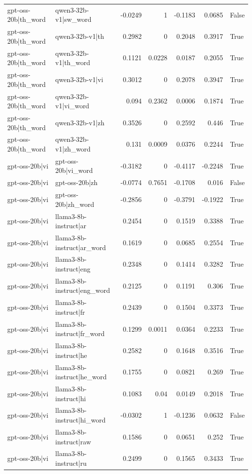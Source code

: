 \begin{table}
\begin{tabular}{l l r r r r l}
gpt-oss-20b|th_word & qwen3-32b-v1|sw_word & -0.0249 & 1 & -0.1183 & 0.0685 & False \\
gpt-oss-20b|th_word & qwen3-32b-v1|th & 0.2982 & 0 & 0.2048 & 0.3917 & True \\
gpt-oss-20b|th_word & qwen3-32b-v1|th_word & 0.1121 & 0.0228 & 0.0187 & 0.2055 & True \\
gpt-oss-20b|th_word & qwen3-32b-v1|vi & 0.3012 & 0 & 0.2078 & 0.3947 & True \\
gpt-oss-20b|th_word & qwen3-32b-v1|vi_word & 0.094 & 0.2362 & 0.0006 & 0.1874 & True \\
gpt-oss-20b|th_word & qwen3-32b-v1|zh & 0.3526 & 0 & 0.2592 & 0.446 & True \\
gpt-oss-20b|th_word & qwen3-32b-v1|zh_word & 0.131 & 0.0009 & 0.0376 & 0.2244 & True \\
gpt-oss-20b|vi & gpt-oss-20b|vi_word & -0.3182 & 0 & -0.4117 & -0.2248 & True \\
gpt-oss-20b|vi & gpt-oss-20b|zh & -0.0774 & 0.7651 & -0.1708 & 0.016 & False \\
gpt-oss-20b|vi & gpt-oss-20b|zh_word & -0.2856 & 0 & -0.3791 & -0.1922 & True \\
gpt-oss-20b|vi & llama3-8b-instruct|ar & 0.2454 & 0 & 0.1519 & 0.3388 & True \\
gpt-oss-20b|vi & llama3-8b-instruct|ar_word & 0.1619 & 0 & 0.0685 & 0.2554 & True \\
gpt-oss-20b|vi & llama3-8b-instruct|eng & 0.2348 & 0 & 0.1414 & 0.3282 & True \\
gpt-oss-20b|vi & llama3-8b-instruct|eng_word & 0.2125 & 0 & 0.1191 & 0.306 & True \\
gpt-oss-20b|vi & llama3-8b-instruct|fr & 0.2439 & 0 & 0.1504 & 0.3373 & True \\
gpt-oss-20b|vi & llama3-8b-instruct|fr_word & 0.1299 & 0.0011 & 0.0364 & 0.2233 & True \\
gpt-oss-20b|vi & llama3-8b-instruct|he & 0.2582 & 0 & 0.1648 & 0.3516 & True \\
gpt-oss-20b|vi & llama3-8b-instruct|he_word & 0.1755 & 0 & 0.0821 & 0.269 & True \\
gpt-oss-20b|vi & llama3-8b-instruct|hi & 0.1083 & 0.04 & 0.0149 & 0.2018 & True \\
gpt-oss-20b|vi & llama3-8b-instruct|hi_word & -0.0302 & 1 & -0.1236 & 0.0632 & False \\
gpt-oss-20b|vi & llama3-8b-instruct|raw & 0.1586 & 0 & 0.0651 & 0.252 & True \\
gpt-oss-20b|vi & llama3-8b-instruct|ru & 0.2499 & 0 & 0.1565 & 0.3433 & True \\

\end{tabular}
\end{table}
